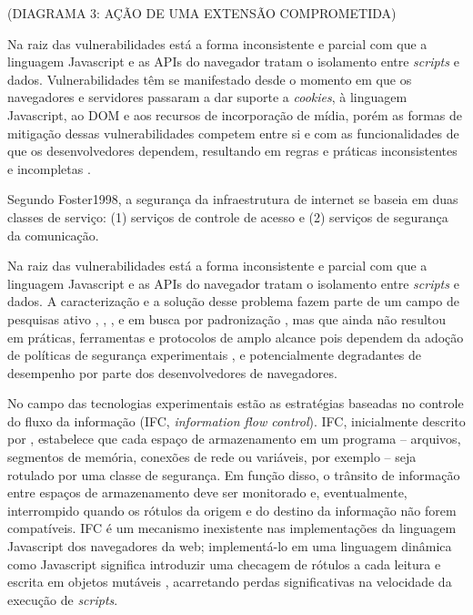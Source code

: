 (DIAGRAMA 3: AÇÃO DE UMA EXTENSÃO COMPROMETIDA)

Na raiz das vulnerabilidades está a forma inconsistente e parcial com que a linguagem Javascript e as APIs do navegador tratam o isolamento entre \textit{scripts} e dados. 
Vulnerabilidades têm se manifestado desde o momento em que os navegadores e servidores passaram a dar suporte a \textit{cookies}, à linguagem Javascript, ao DOM e aos recursos de incorporação de mídia, porém as formas de mitigação dessas vulnerabilidades competem entre si e com as funcionalidades de que os desenvolvedores dependem, resultando em regras e práticas inconsistentes e incompletas \cite{Hill2016}.



Segundo Foster1998, a segurança da infraestrutura de internet se baseia em duas classes de serviço: (1) serviços de controle de acesso e (2) serviços de segurança da comunicação.

Na raiz das vulnerabilidades está a forma inconsistente e parcial com que a linguagem Javascript e as APIs do navegador tratam o isolamento entre \textit{scripts} e dados. A caracterização e a solução desse problema fazem parte de um campo de pesquisas ativo \cite{Stefan2014}, \cite{Hedin2014}, \cite{Bichhawat2014}, \cite{Magazinius2014} e em busca por padronização \cite{W3C:WebAppSec}, mas que ainda não resultou em práticas, ferramentas e protocolos de amplo alcance pois dependem da adoção de políticas de segurança experimentais \cite{Hedin2014}, \cite{Bichhawat2014} e potencialmente degradantes de desempenho \cite[p. 14]{Stefan2014} por parte dos desenvolvedores de navegadores.

No campo das tecnologias experimentais estão as estratégias baseadas no controle do fluxo da informação (IFC, \textit{information flow control}). IFC, inicialmente descrito por \cite{Denning1976}, estabelece que cada espaço de armazenamento em um programa -- arquivos, segmentos de memória, conexões de rede ou variáveis, por exemplo -- seja rotulado por uma classe de segurança. Em função disso, o trânsito de informação entre espaços de armazenamento deve ser monitorado e, eventualmente, interrompido quando os rótulos da origem e do destino da informação não forem compatíveis. IFC é um mecanismo inexistente nas implementações da linguagem Javascript dos navegadores da web; implementá-lo em uma linguagem dinâmica como Javascript significa introduzir uma checagem de rótulos a cada leitura e escrita em objetos mutáveis \cite[p.3]{Heule2015_IFC_Inside}, acarretando perdas significativas na velocidade da execução de \textit{scripts}.

